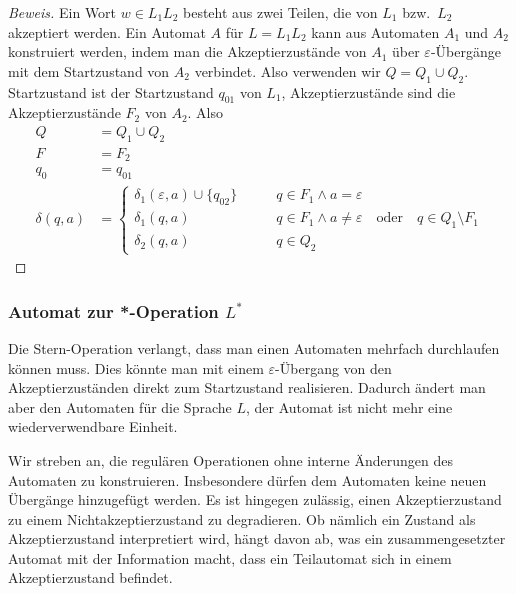 \begin{proof}[Beweis]
Ein Wort $w\in L_1L_2$ besteht aus zwei Teilen, die von $L_1$
bzw.~$L_2$ akzeptiert werden.
Ein Automat $A$ für $L=L_1L_2$ kann aus Automaten $A_1$ und $A_2$
konstruiert werden, indem man
die Akzeptierzustände von $A_1$ über $\varepsilon$-Übergänge
mit dem Startzustand von $A_2$ verbindet.
Also verwenden wir $Q=Q_1\cup Q_2$.
Startzustand ist der Startzustand $q_{01}$ von $L_1$, Akzeptierzustände
sind die Akzeptierzustände $F_2$ von $A_2$.
Also
\begin{align*}
Q&=Q_1\cup Q_2\\
F&=F_2\\
q_0&=q_{01}\\
\delta(q,a)&=\begin{cases}
\delta_1(\varepsilon,a)\cup\{q_{02}\}&\qquad q\in F_1 \wedge a=\varepsilon\\
\delta_1(q,a)                        &\qquad q\in F_1 \wedge a\ne\varepsilon
\quad\text{oder}\quad q\in Q_1\setminus F_1\\
\delta_2(q,a)                        &\qquad q\in Q_2
\end{cases}
\end{align*}
\end{proof}

\subsubsection{Automat zur *-Operation $L^*$}
%
Die Stern-Operation verlangt, dass man einen Automaten mehrfach
durchlaufen können muss.
Dies könnte man mit einem $\varepsilon$-Übergang
von den Akzeptierzuständen direkt zum Startzustand realisieren.
Dadurch ändert man aber den Automaten für die Sprache $L$,
der Automat ist nicht mehr eine wiederverwendbare Einheit.

Wir streben an, die regulären Operationen ohne interne Änderungen
des Automaten zu konstruieren.
Insbesondere dürfen dem Automaten keine neuen Übergänge hinzugefügt
werden.
Es ist hingegen zulässig, einen Akzeptierzustand zu einem
Nichtakzeptierzustand zu degradieren.
Ob nämlich ein Zustand als Akzeptierzustand interpretiert wird,
hängt davon ab, was ein zusammengesetzter Automat mit der Information
macht, dass ein Teilautomat sich in einem Akzeptierzustand befindet.


